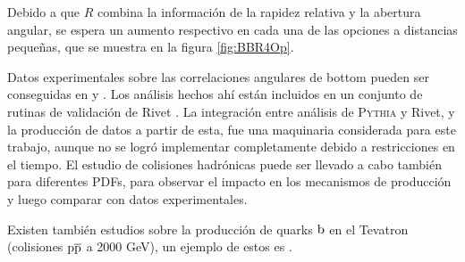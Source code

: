 Debido a que $R$ combina la información de la rapidez relativa y la abertura angular, se espera un aumento respectivo en cada una de las opciones a distancias pequeñas, que se muestra en la figura \ref{fig:BBR4Op}.

Datos experimentales sobre las correlaciones angulares de bottom pueden ser conseguidas en \cite{Khachatryan:2011wq} y \cite{ATLAS:2011ac}. Los análisis hechos ahí están incluidos en un conjunto de rutinas de validación de Rivet \cite{Buckley:2010ar}. La integración entre análisis de \textsc{Pythia} y Rivet, y la producción de datos a partir de esta, fue una maquinaria considerada para este trabajo, aunque no se logró implementar completamente debido a restricciones en el tiempo. El estudio de colisiones hadrónicas puede ser llevado a cabo también para diferentes PDFs, para observar el impacto en los mecanismos de producción y luego comparar con datos experimentales.

Existen también estudios sobre la producción de quarks ${\mathrm b}$ en el Tevatron (colisiones ${\mathrm p}\overline{\mathrm p}$ a 2000 GeV), un ejemplo de estos es \cite{vallecorsa}.
